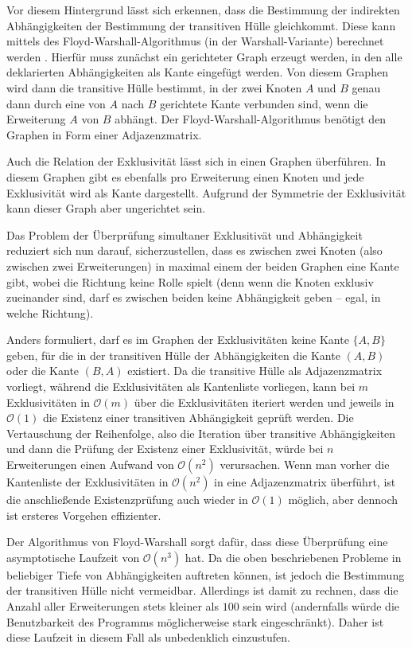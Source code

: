 Vor diesem Hintergrund lässt sich erkennen, dass die Bestimmung der indirekten Abhängigkeiten der Bestimmung der transitiven Hülle gleichkommt. Diese kann mittels des Floyd-Warshall-Algorithmus (in der Warshall-Variante) berechnet werden \cite{warshal1_algorithm}. Hierfür muss zunächst ein gerichteter Graph erzeugt werden, in den alle deklarierten Abhängigkeiten als Kante eingefügt werden. Von diesem Graphen wird dann die transitive Hülle bestimmt, in der zwei Knoten $A$ und $B$ genau dann durch eine von $A$ nach $B$ gerichtete Kante verbunden sind, wenn die Erweiterung $A$ von $B$ abhängt. Der Floyd-Warshall-Algorithmus benötigt den Graphen in Form einer Adjazenzmatrix.

Auch die Relation der Exklusivität lässt sich in einen Graphen überführen. In diesem Graphen gibt es ebenfalls pro Erweiterung einen Knoten und jede Exklusivität wird als Kante dargestellt. Aufgrund der Symmetrie der Exklusivität kann dieser Graph aber ungerichtet sein.

Das Problem der Überprüfung simultaner Exklusitivät und Abhängigkeit reduziert sich nun darauf, sicherzustellen, dass es zwischen zwei Knoten (also zwischen zwei Erweiterungen) in maximal einem der beiden Graphen eine Kante gibt, wobei die Richtung keine Rolle spielt (denn wenn die Knoten exklusiv zueinander sind, darf es zwischen beiden keine Abhängigkeit geben -- egal, in welche Richtung).

Anders formuliert, darf es im Graphen der Exklusivitäten keine Kante $\{A, B\}$ geben, für die in der transitiven Hülle der Abhängigkeiten die Kante $(A, B)$ oder die Kante $(B, A)$ existiert. Da die transitive Hülle als Adjazenzmatrix vorliegt, während die Exklusivitäten als Kantenliste vorliegen, kann bei $m$ Exklusivitäten in $\mathcal{O}(m)$ über die Exklusivitäten iteriert werden und jeweils in $\mathcal{O}(1)$ die Existenz einer transitiven Abhängigkeit geprüft werden. Die Vertauschung der Reihenfolge, also die Iteration über transitive Abhängigkeiten und dann die Prüfung der Existenz einer Exklusivität, würde bei $n$ Erweiterungen einen Aufwand von $\mathcal{O}(n^2)$ verursachen. Wenn man vorher die Kantenliste der Exklusivitäten in $\mathcal{O}(n^2)$ in eine Adjazenzmatrix überführt, ist die anschließende Existenzprüfung auch wieder in $\mathcal{O}(1)$ möglich, aber dennoch ist ersteres Vorgehen effizienter.

Der Algorithmus von Floyd-Warshall sorgt dafür, dass diese Überprüfung eine asymptotische Laufzeit von $\mathcal{O}(n^3)$ hat. Da die oben beschriebenen Probleme in beliebiger Tiefe von Abhängigkeiten auftreten können, ist jedoch die Bestimmung der transitiven Hülle nicht vermeidbar. Allerdings ist damit zu rechnen, dass die Anzahl aller Erweiterungen stets kleiner als $100$ sein wird (andernfalls würde die Benutzbarkeit des Programms möglicherweise stark eingeschränkt). Daher ist diese Laufzeit in diesem Fall als unbedenklich einzustufen.

